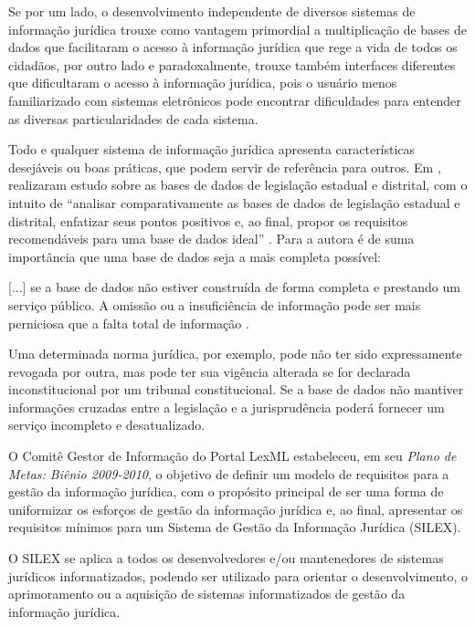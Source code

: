 \documentclass[a4paper,11pt,openright,twoside,brazil]{abntex2}
\begin{document}
Se por um lado, o desenvolvimento independente de diversos sistemas de
informação jurídica trouxe como vantagem primordial a multiplicação de bases de
dados que facilitaram o acesso à informação jurídica que rege a vida de todos os
cidadãos, por outro lado e paradoxalmente, trouxe também interfaces diferentes
que dificultaram o acesso à informação jurídica, pois o usuário menos
familiarizado com sistemas eletrônicos pode encontrar dificuldades para entender
as diversas particularidades de cada sistema.

Todo e qualquer sistema de informação jurídica apresenta características
desejáveis ou boas práticas, que podem servir de referência para outros. Em
\citeyear{passos2009},  realizaram estudo sobre as
bases de dados de legislação estadual e distrital, com o intuito de ``analisar
comparativamente as bases de dados de legislação estadual e distrital, enfatizar
seus pontos positivos e, ao final, propor os requisitos recomendáveis para uma
base de dados ideal'' \cite[p.~17]{passos2009}. Para a autora é de suma
importância que uma base de dados seja a mais completa possível:

\begin{citacao}
 $[$...$]$ se a base de dados não estiver construída de forma completa e
prestando um serviço público. A omissão ou a insuficiência de informação pode
ser mais perniciosa que a falta total de informação \cite[p.~17]{passos2009}.
\end{citacao}

Uma determinada norma jurídica, por exemplo, pode não ter sido expressamente
revogada por outra, mas pode ter sua vigência alterada se for declarada
inconstitucional por um tribunal constitucional. Se a base de dados não mantiver
informações cruzadas entre a legislação e a jurisprudência poderá fornecer um
serviço incompleto e desatualizado.

O Comitê Gestor de Informação do Portal LexML estabeleceu, em seu \emph{Plano de
Metas: Biênio 2009-2010}, o objetivo de definir um modelo de requisitos para a
gestão da informação jurídica, com o propósito principal de ser uma forma de
uniformizar os esforços de gestão da informação jurídica e, ao final, apresentar
os requisitos mínimos para um Sistema de Gestão da Informação Jurídica (SILEX).

O SILEX se aplica a todos os desenvolvedores e/ou mantenedores de sistemas
jurídicos informatizados, podendo ser utilizado para orientar o desenvolvimento,
o aprimoramento ou a aquisição de sistemas informatizados de gestão da
informação jurídica.
\end{document}
